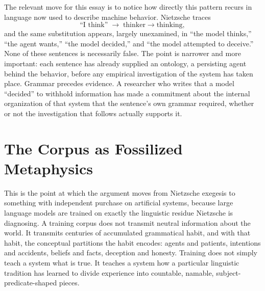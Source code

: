 \documentclass[11pt]{article}
\begin{document}
The relevant move for this essay is to notice how directly this pattern recurs in language now used to describe machine behavior. Nietzsche traces
\[
\text{``I think''} \;\longrightarrow\; \text{thinker} \rightarrow \text{thinking},
\]
and the same substitution appears, largely unexamined, in ``the model thinks,'' ``the agent wants,'' ``the model decided,'' and ``the model attempted to deceive.'' None of these sentences is necessarily false. The point is narrower and more important: each sentence has already supplied an ontology, a persisting agent behind the behavior, before any empirical investigation of the system has taken place. Grammar precedes evidence. A researcher who writes that a model ``decided'' to withhold information has made a commitment about the internal organization of that system that the sentence's own grammar required, whether or not the investigation that follows actually supports it.

\section{The Corpus as Fossilized Metaphysics}

This is the point at which the argument moves from Nietzsche exegesis to something with independent purchase on artificial systems, because large language models are trained on exactly the linguistic residue Nietzsche is diagnosing. A training corpus does not transmit neutral information about the world. It transmits centuries of accumulated grammatical habit, and with that habit, the conceptual partitions the habit encodes: agents and patients, intentions and accidents, beliefs and facts, deception and honesty. Training does not simply teach a system what is true. It teaches a system how a particular linguistic tradition has learned to divide experience into countable, namable, subject-predicate-shaped pieces.
\end{document}
